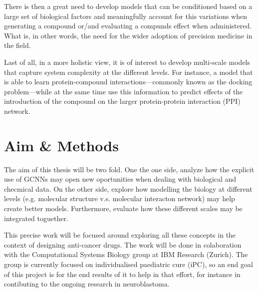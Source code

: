 \documentclass{article}
\begin{document}
There is then a great need to develop models that can be conditioned based on a large
set of biological factors and meaningfully account for this variations when generating a
compound or/and evaluating a compunds effect when administered. What is, in other
words, the need for the wider adoption of precision medicine in the field.

Last of all, in a more holistic view, it is of interest to develop multi-scale models
that capture system complexity at the different levels. For instance, a model that is
able to learn protein-compound interactions---commonly known as the docking
problem---while at the same time use this information to predict effects of the
introduction of the compound on the larger protein-protein interaction (PPI)
network\cite{Sun2019}.

    \section*{Aim \& Methods}

The aim of this thesis will be two fold. One the one side, analyze how the explicit use
of GCNNs may open new oportunities when dealing with biological and checmical data. On
the other side, explore how modelling the biology at different levels (e.g. molecular
structure v.s. molecular interacton network) may help 
create better models. Furthermore, evaluate how these different scales may be integrated
toguether.

This precise work will be focused around exploring all these concepts in the context of
designing anti-cancer drugs. The work will be done in colaboration with the
Computational Systems Biology group at IBM Research (Zurich). The group is currently
focused on individualised paediatric cure (iPC), so an end goal of this project is for
the end results of it to help in that effort, for instance in contibuting to the ongoing
research in neuroblastoma.
\end{document}
